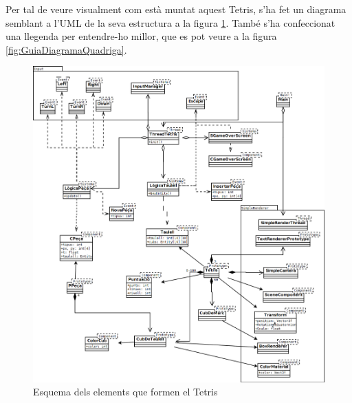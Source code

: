     Per tal de veure visualment com està muntat aquest Tetris, s'ha fet un diagrama semblant a l'UML de la seva estructura a la figura \ref{fig:TetrisEntitats}. També s'ha confeccionat una llegenda per entendre-ho millor, que es pot veure a la figura \ref{fig:GuiaDiagramaQuadriga}.

    \begin{figure}
      \includegraphics[width=1\linewidth]{./img/TetrisEntitats.png}
      \caption{Esquema dels elements que formen el Tetris \label{fig:TetrisEntitats}}
    \end{figure}

